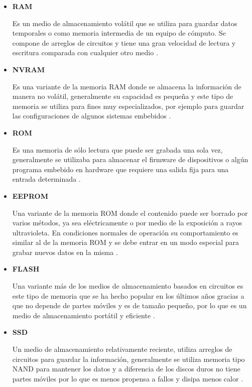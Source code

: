 \begin{itemize}

  \item \textbf{RAM}
  
  Es un medio de almacenamiento vol\'{a}til que se utiliza para guardar datos temporales o como memoria intermedia de un equipo de c\'{o}mputo. Se compone de arreglos de circuitos y tiene una gran velocidad de lectura y escritura comparada con cualquier otro medio \cite{_rom_????}.
  
  \item \textbf{NVRAM}
  
  Es una variante de la memoria RAM donde se almacena la informaci\'{o}n de manera no vol\'{a}til, generalmente su capacidad es peque\~{n}a y este tipo de memoria se utiliza para fines muy especializados, por ejemplo para guardar las configuraciones de algunos sistemas embebidos \cite{veenstra_random_1986}.
  
  \item \textbf{ROM}
  
  Es una memoria de s\'{o}lo lectura que puede ser grabada una sola vez, generalmente se utilizaba para almacenar el firmware de dispositivos o alg\'{u}n programa embebido en hardware que requiere una salida fija para una entrada determinada \cite{_rom_????}.
  
  \item \textbf{EEPROM}
  
  Una variante de la memoria ROM donde el contenido puede ser borrado por varios m\'{e}todos, ya sea el\'{e}ctricamente o por medio de la exposici\'{o}n a rayos ultravioleta. En condiciones normales de operaci\'{o}n su comportamiento es similar al de la memoria ROM y se debe entrar en un modo especial para grabar nuevos datos en la misma \cite{_rom_????-1}.
  
  \item \textbf{FLASH}
  
  Una variante m\'{a}s de los medios de almacenamiento basados en circuitos es este tipo de memoria que se ha hecho popular en los \'{u}ltimos a\~{n}os gracias a que no depende de partes m\'{o}viles y es de tama\~{n}o peque\~{n}o, por lo que es un medio de almacenamiento port\'{a}til y eficiente \cite{_flashmemguide.pdf_????}.
  
  \item \textbf{SSD}
  
  Un medio de almacenamiento relativamente reciente, utiliza arreglos de circuitos para guardar la informaci\'{o}n, generalmente se utiliza memoria tipo NAND para mantener los datos y a diferencia de los discos duros no tiene partes m\'{o}viles por lo que es menos propensa a fallos y disipa menos calor \cite{_ssd-faq-us.pdf_????}.
  
\end{itemize}

